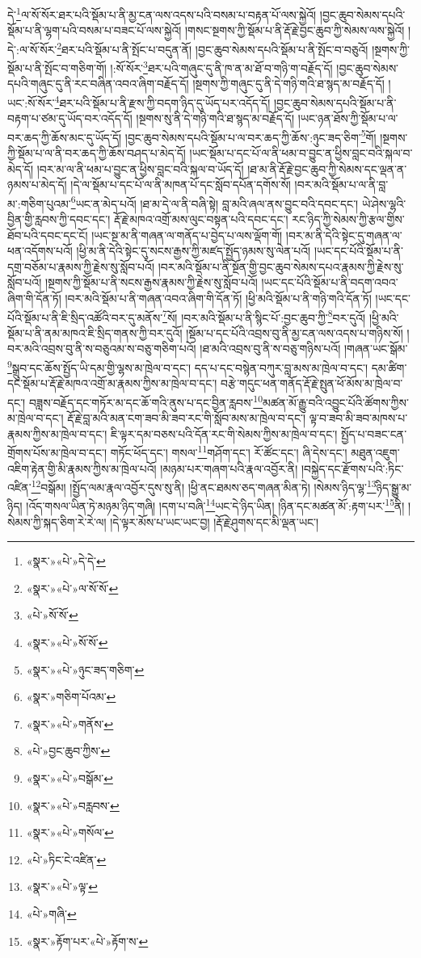 དེ་\footnote{«སྣར་»«པེ་»དེ་དེ་}ལ་སོ་སོར་ཐར་པའི་སྡོམ་པ་ནི་མྱ་ངན་ལས་འདས་པའི་བསམ་པ་བརྟན་པོ་ལས་སྐྱེའོ། །བྱང་ཆུབ་སེམས་དཔའི་སྡོམ་པ་ནི་ལྷག་པའི་བསམ་པ་བཟང་པོ་ལས་སྐྱེའོ། །གསང་སྔགས་ཀྱི་སྡོམ་པ་ནི་རྡོ་རྗེ་བྱང་ཆུབ་ཀྱི་སེམས་ལས་སྐྱེའོ། །དེ་:ལ་སོ་སོར་\footnote{«སྣར་»«པེ་»ལ་སོ་སོ་}ཐར་པའི་སྡོམ་པ་ནི་སྤོང་པ་བདུན་ནོ། །བྱང་ཆུབ་སེམས་དཔའི་སྡོམ་པ་ནི་སྤོང་བ་བཅུའོ། །སྔགས་ཀྱི་སྡོམ་པ་ནི་སྤོང་བ་གཅིག་གོ། །:སོ་སོར་\footnote{«པེ་»སོ་སོ་}ཐར་པའི་གཞུང་དུ་ནི་ཁ་ན་མ་ཐོ་བ་གཉི་ག་བརྗོད་དོ། །བྱང་ཆུབ་སེམས་དཔའི་གཞུང་དུ་ནི་རང་བཞིན་འབའ་ཞིག་བརྗོད་དོ། །སྔགས་ཀྱི་གཞུང་དུ་ནི་དེ་གཉི་གའི་ཐ་སྙད་མ་བརྗོད་དོ། །ཡང་:སོ་སོར་\footnote{«སྣར་»«པེ་»སོ་སོ་}ཐར་པའི་སྡོམ་པ་ནི་རྫས་ཀྱི་བདག་ཉིད་དུ་ཡོད་པར་འདོད་དོ། །བྱང་ཆུབ་སེམས་དཔའི་སྡོམ་པ་ནི་བརྟག་པ་ཙམ་དུ་ཡོད་བར་འདོད་དོ། །སྔགས་སུ་ནི་དེ་གཉི་གའི་ཐ་སྙད་མ་བརྗོད་དོ། །ཡང་ཉན་ཐོས་ཀྱི་སྡོམ་པ་ལ་བར་ཆད་ཀྱི་ཆོས་མང་དུ་ཡོད་དོ། །བྱང་ཆུབ་སེམས་དཔའི་སྡོམ་པ་ལ་བར་ཆད་ཀྱི་ཆོས་:ཉུང་ཟད་ཅིག་\footnote{«སྣར་»«པེ་»ཉུང་ཟད་གཅིག་}གོ། །སྔགས་ཀྱི་སྡོམ་པ་ལ་ནི་བར་ཆད་ཀྱི་ཆོས་བཤད་པ་མེད་དོ། །ཡང་སྡོམ་པ་དང་པོ་ལ་ནི་ཕམ་བ་བྱུང་ན་ཕྱིས་བླང་བའི་སྐལ་བ་མེད་དོ། །བར་མ་ལ་ནི་ཕམ་པ་བྱུང་ན་ཕྱིས་བླང་བའི་སྐལ་བ་ཡོད་དོ། །ཐ་མ་ནི་རྡོ་རྗེ་བྱང་ཆུབ་ཀྱི་སེམས་དང་ལྡན་ན་ཉམས་པ་མེད་དོ། །དེ་ལ་སྡོམ་པ་དང་པོ་ལ་ནི་མཁན་པོ་དང་སློབ་དཔོན་དགོས་སོ། །བར་མའི་སྡོམ་པ་ལ་ནི་བླ་མ་:གཅིག་པུའམ་\footnote{«སྣར་»གཅིག་པོའམ་}ཡང་ན་མེད་པའོ། །ཐ་མ་དེ་ལ་ནི་བཞི་སྟེ། བླ་མའི་ཞལ་ནས་བྱུང་བའི་དབང་དང་། ཡེ་ཤེས་ལྷའི་བྱིན་གྱི་རླབས་ཀྱི་དབང་དང་། རྡོ་རྗེ་མཁའ་འགྲོ་མས་ལུང་བསྟན་པའི་དབང་དང་། རང་ཉིད་ཀྱི་སེམས་ཀྱི་རྩལ་གྱིས་ཐོབ་པའི་དབང་དང་ངོ། །ཡང་སྔ་མ་ནི་གཞན་ལ་གནོད་པ་བྱེད་པ་ལས་ལྡོག་གོ། །བར་མ་ནི་དེའི་སྟེང་དུ་གཞན་ལ་ཕན་འདོགས་པའོ། །ཕྱི་མ་ནི་དེའི་སྟེང་དུ་སངས་རྒྱས་ཀྱི་མཛད་སྤྱོད་ཉམས་སུ་ལེན་པའོ། །ཡང་དང་པོའི་སྡོམ་པ་ནི་དགྲ་བཅོམ་པ་རྣམས་ཀྱི་རྗེས་སུ་སློབ་པའོ། །བར་མའི་སྡོམ་པ་ནི་སྔོན་གྱི་བྱང་ཆུབ་སེམས་དཔའ་རྣམས་ཀྱི་རྗེས་སུ་སློབ་པའོ། །སྔགས་ཀྱི་སྡོམ་པ་ནི་སངས་རྒྱས་རྣམས་ཀྱི་རྗེས་སུ་སློབ་པའོ། །ཡང་དང་པོའི་སྡོམ་པ་ནི་བདག་འབའ་ཞིག་གི་དོན་ཏོ། །བར་མའི་སྡོམ་པ་ནི་གཞན་འབའ་ཞིག་གི་དོན་ཏོ། །ཕྱི་མའི་སྡོམ་པ་ནི་གཉི་གའི་དོན་ཏོ། །ཡང་དང་པོའི་སྡོམ་པ་ནི་ཇི་སྲིད་འཚོའི་བར་དུ་མནོས་\footnote{«སྣར་»«པེ་»གནོས་}སོ། །བར་མའི་སྡོམ་པ་ནི་སྙིང་པོ་:བྱང་ཆུབ་ཀྱི་\footnote{«པེ་»བྱང་ཆུབ་ཀྱིས་}བར་དུའོ། །ཕྱི་མའི་སྡོམ་པ་ནི་ནམ་མཁའ་ཇི་སྲིད་གནས་ཀྱི་བར་དུའོ། །སྡོམ་པ་དང་པོའི་འབྲས་བུ་ནི་མྱ་ངན་ལས་འདས་པ་གཉིས་སོ། །བར་མའི་འབྲས་བུ་ནི་ས་བཅུའམ་ས་བཅུ་གཅིག་པའོ། །ཐ་མའི་འབྲས་བུ་ནི་ས་བཅུ་གཉིས་པའོ། །གཞན་ཡང་སྒོམ་\footnote{«སྣར་»«པེ་»བསྒོམ་}སྒྲུབ་དང་ཆོས་སྤྱོད་ཡི་དམ་གྱི་ལྷས་མ་ཁྲེལ་བ་དང་། དད་པ་དང་བསྙེན་བཀུར་བླ་མས་མ་ཁྲེལ་བ་དང་། དམ་ཚིག་དང་སྡོམ་པ་རྡོ་རྗེ་མཁའ་འགྲོ་མ་རྣམས་ཀྱིས་མ་ཁྲེལ་བ་དང་། བརྩེ་གདུང་ཕན་གནོད་རྡོ་རྗེ་སྤུན་ཕོ་མོས་མ་ཁྲེལ་བ་དང་། བཟླས་བརྗོད་དང་གཏོར་མ་དང་ཆོ་གའི་ནུས་པ་དང་བྱིན་རླབས་\footnote{«སྣར་»«པེ་»བརླབས་}མཚན་མོ་རྒྱུ་བའི་འབྱུང་པོའི་ཚོགས་ཀྱིས་མ་ཁྲེལ་བ་དང་། རྡོ་རྗེ་བླ་མའི་མན་ངག་ཟབ་མི་ཟབ་རང་གི་སློབ་མས་མ་ཁྲེལ་བ་དང་། ལྟ་བ་ཟབ་མི་ཟབ་མཁས་པ་རྣམས་ཀྱིས་མ་ཁྲེལ་བ་དང་། ཇི་ལྟར་དམ་བཅས་པའི་དོན་རང་གི་སེམས་ཀྱིས་མ་ཁྲེལ་བ་དང་། སྤྱོད་པ་བཟང་ངན་གྲོགས་པོས་མ་ཁྲེལ་བ་དང་། གཏོང་ཕོད་དང་། གསལ་\footnote{«སྣར་»«པེ་»གསོལ་}གཤོག་དང་། རོ་ཚོང་དང་། ཞི་དེས་དང་། མཐུན་འཇུག་འཇིག་རྟེན་གྱི་མི་རྣམས་ཀྱིས་མ་ཁྲེལ་པའོ། །མཉམ་པར་གཞག་པའི་རྣལ་འབྱོར་ནི། །བསྐྱེད་དང་རྫོགས་པའི་:ཏིང་འཛིན་\footnote{«པེ་»ཏིང་ངེ་འཛིན་}བསྒོམ། །སྤྱོད་ལམ་རྣལ་འབྱོར་དུས་སུ་ནི། །ཕྱི་ནང་ཐམས་ཅད་གཞན་མིན་ཏེ། །སེམས་ཉིད་ལྷ་\footnote{«སྣར་»«པེ་»ལྟ་}ཉིད་སྒྱུ་མ་ཉིད། །འོད་གསལ་ཡིན་ཏེ་མཉམ་ཉིད་གཞི། །དག་པ་བཞི་\footnote{«པེ་»གཞི་}ཡང་དེ་ཉིད་ཡིན། །ཉིན་དང་མཚན་མོ་:རྟག་པར་\footnote{«སྣར་»རྟོག་པར་«པེ་»རྟོག་ས་}ནི། །སེམས་ཀྱི་སྐད་ཅིག་རེ་རེ་ལ། །དེ་ལྟར་མོས་པ་ཡང་ཡང་བྱ། །རྡོ་རྗེ་ཤུགས་དང་མི་ལྡན་ཡང་། 